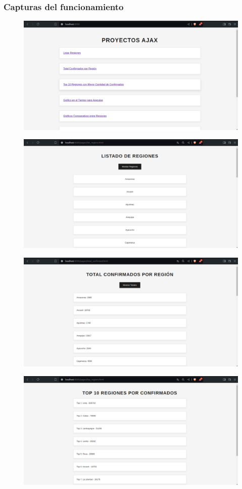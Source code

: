 \documentclass{article}
\begin{document}
\subsubsection{Capturas del funcionamiento}
\begin{figure}[h]
\centering
\includegraphics[width=0.8\linewidth]{latex//img/index_html.png}
\caption{}
\label{fig:enter-label}
\end{figure}
\begin{figure}[h]
\centering
\includegraphics[width=0.8\linewidth]{latex//img/result2.png}
\caption{}
\label{fig:enter-label}
\end{figure}
\begin{figure}[h]
\centering
\includegraphics[width=0.8\linewidth]{latex//img/result3.png}
\caption{}
\label{fig:enter-label}
\end{figure}
\begin{figure}[h]
\centering
\includegraphics[width=0.75\linewidth]{latex//img/result4.png}
\caption{}
\label{fig:enter-label}
\end{figure}
\end{document}
